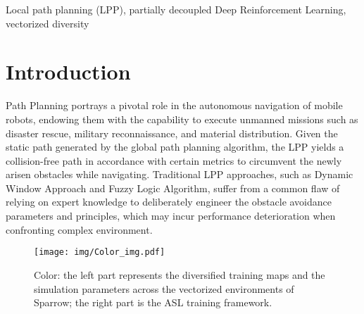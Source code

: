 \documentclass[journal]{IEEEtran}
\begin{document}
\begin{IEEEkeywords}
	Local path planning (LPP), partially decoupled Deep Reinforcement Learning, vectorized diversity
\end{IEEEkeywords}

\section{Introduction}

 Path Planning portrays a pivotal role in the autonomous navigation of mobile robots, endowing them with the capability to execute unmanned missions such as disaster rescue, military reconnaissance, and material distribution. Given the static path generated by the global path planning algorithm, the LPP yields a collision-free path in accordance with certain metrics to circumvent the newly arisen obstacles while navigating. Traditional LPP approaches, such as Dynamic Window Approach\cite{DWA} and Fuzzy Logic Algorithm\cite{FLA}, suffer from a common flaw of relying on expert knowledge to deliberately engineer the obstacle avoidance parameters and principles, which may incur performance deterioration when confronting complex environment\cite{DWA_flaw,UAV_review}.

\begin{figure}
	\centering
	\texttt{[image: img/Color\_img.pdf]}
	\caption{Color: the left part represents the diversified training maps and the simulation parameters across the vectorized environments of Sparrow; the right part is the ASL training framework.}
	\label{Color}
\end{figure}
\end{document}

